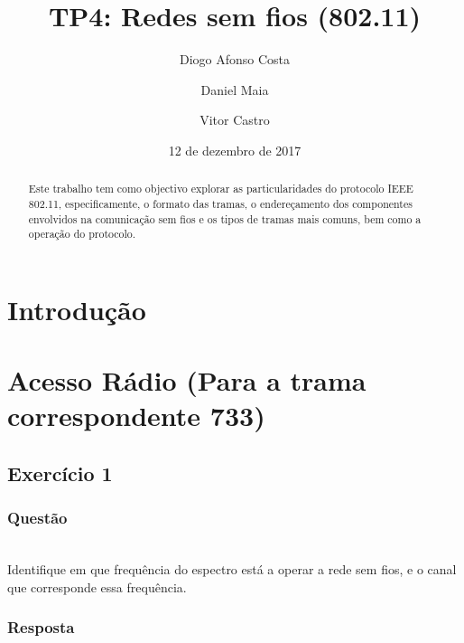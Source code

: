 \documentclass{llncs}
\begin{document}
\mainmatter
\title{TP4: Redes sem fios (802.11)}


\author{Diogo Afonso Costa \and Daniel Maia \and Vitor Castro}



\date{12 de dezembro de 2017}


\maketitle
\begin{abstract}

Este trabalho tem como objectivo explorar as particularidades do protocolo IEEE 802.11, especificamente, o formato das tramas, o endereçamento dos componentes envolvidos na comunicação sem fios e os tipos de tramas mais comuns, bem como a operação do protocolo.

\end{abstract}

\section{Introdução}



\clearpage
\section{Acesso Rádio (Para a trama correspondente 733)}

\subsection{Exercício 1}
\subsubsection{Questão}\rule[-10pt]{0pt}{10pt}\\

Identifique em que frequência do espectro está a operar a rede sem fios, e o canal que corresponde essa frequência.

\subsubsection{Resposta}\rule[-10pt]{0pt}{10pt}\\
\end{document}
